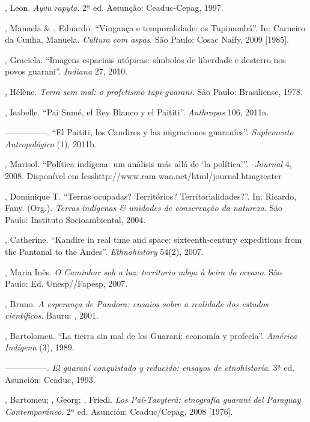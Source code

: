 \begin{Parskip}
, Leon. \emph{Ayvu rapyta}. 2ª ed. Assunção: Ceaduc-Cepag, 1997.

, Manuela \& , Eduardo.
``Vingança e temporalidade: os Tupinambá''. In: Carneiro da Cunha,
Manuela. \emph{Cultura com aspas}. São Paulo: Cosac Naify, 2009 [1985].

, Graciela. ``Imagens espaciais utópicas: símbolos de
liberdade e desterro nos povos guarani''. \emph{Indiana} 27, 2010. 

, Hélène. \emph{Terra sem mal: o profetismo tupi-guarani}. São
Paulo: Brasiliense, 1978.

, Isabelle. ``Pai Sumé, el Rey Blanco y el Paititi''. \emph{Anthropos}
106, 2011a.

—————. ``El Paititi, los Candires y las migraciones guaraníes''.
\emph{Suplemento Antropológico}  (1), 2011b.

, Marisol. ``Política indígena: um análisis más allá de
‘la política’''. \emph{-Journal} 4, 2008. Disponível em
{less}http://www.ram-wan.net/html/journal.htm{greater}

, Dominique T. ``Terras ocupadas? Territórios?
Territorialidades?''. In: Ricardo, Fany. (Org.). \emph{Terras indígenas \&
unidades de conservação da natureza}. São Paulo: Instituto
Socioambiental, 2004.

, Catherine. ``Kandire in real time and space:
sixteenth-century expeditions from the Pantanal to the Andes''.
\emph{Ethnohistory} 54(2), 2007.

, Maria Inês. \emph{O Caminhar sob a luz: territorio mbya à beira
do oceano}. São Paulo: Ed. Unesp//Fapesp, 2007.

, Bruno. \emph{A esperança de Pandora: ensaios sobre a realidade
dos estudos científicos}. Bauru: , 2001.

, Bartolomeu. ``La tierra sin mal de los Guaraní: economía y
profecía''. \emph{América Indígena}  (3), 1989.

—————. \emph{El guaraní conquistado y reducido: ensayos de etnohistoria}.
3ª ed. Asunción: Ceaduc, 1993.

, Bartomeu; , Georg; , Friedl. \emph{Los
Paĩ-Tavyterã: etnografía guaraní del Paraguay Contemporáneo}. 2ª
ed. Asunción: Ceaduc/Cepag, 2008 [1976].


\end{Parskip}
